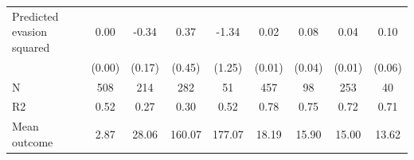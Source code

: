 \begin{tabular}{lcccc|cccc}
\addlinespace
Predicted evasion squared&        0.00         &       -0.34\sym{*}  &        0.37         &       -1.34         &        0.02         &        0.08\sym{**} &        0.04\sym{**} &        0.10\sym{*}  \\
            &      (0.00)         &      (0.17)         &      (0.45)         &      (1.25)         &      (0.01)         &      (0.04)         &      (0.01)         &      (0.06)         \\
\midrule
N           &         508         &         214         &         282         &          51         &         457         &          98         &         253         &          40         \\
R2          &        0.52         &        0.27         &        0.30         &        0.52         &        0.78         &        0.75         &        0.72         &        0.71         \\
Mean outcome&        2.87         &       28.06         &      160.07         &      177.07         &       18.19         &       15.90         &       15.00         &       13.62         \\
\bottomrule \end{tabular}
